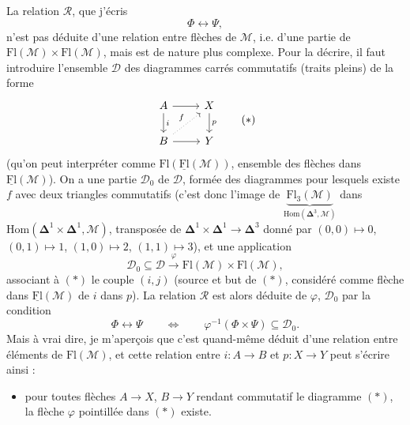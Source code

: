 \documentclass[11pt]{article}
\newcommand{\printedpage}[1]{\marginpar{\footnotesize p.~#1}}
\newcommand{\msp}[1]{\marginpar{\footnotesize [#1]}}
\newcommand{\Fl}{\mathrm{Fl}}
\begin{document}
\begin{itemize}[leftmargin=2.5em]
La relation $\mathcal{R}$, que j'écris
\[
\Phi\longleftrightarrow\Psi,
\]
\msp{page 81}n'est pas déduite d'une relation entre flèches de $\mathcal{M}$, i.e. d'une partie de $\Fl(\mathcal{M})\times\Fl(\mathcal{M})$, mais est de nature plus complexe. Pour la décrire, il faut introduire l'ensemble $\mathcal{D}$ des diagrammes carrés commutatifs (traits pleins) de la forme
\[
\begin{tikzcd}
A \arrow[r] \arrow[d, "i"] & X \arrow[d, "p"] \\
B \arrow[r] \arrow[ur, dotted, "f"] & Y
\end{tikzcd}
\tag*{$(*)$}
\]
\printedpage{50}
(qu'on peut interpréter comme $\Fl(\underline{\Fl}(\mathcal{M}))$, ensemble des flèches dans $\underline{\Fl}(\mathcal{M})$). On a une partie $\mathcal{D}_0$ de $\mathcal{D}$, formée des diagrammes pour lesquels existe $f$ avec deux triangles commutatifs (c'est donc l'image de $\underbrace{\Fl_3(\mathcal{M})}_{\mathrm{Hom}(\boldsymbol{\Delta}^3,\mathcal{M})}$ dans $\mathrm{Hom}(\boldsymbol{\Delta}^1\times\boldsymbol{\Delta}^1,\mathcal{M})$, transposée de $\boldsymbol{\Delta}^1\times\boldsymbol{\Delta}^1\longrightarrow\boldsymbol{\Delta}^3$ donné par $(0,0)\longmapsto 0$, $(0,1)\longmapsto 1$, $(1,0)\longmapsto 2$, $(1,1)\longmapsto 3$), et une application
\[
\mathcal{D}_0\subseteq\mathcal{D}\xrightarrow{\ \varphi\ }\Fl(\mathcal{M})\times\Fl(\mathcal{M}),
\]
associant à $(*)$ le couple $(i,j)$ (source et but de $(*)$, considéré comme flèche dans $\underline{\Fl}(\mathcal{M})$ de $i$ dans $p$). La relation $\mathcal{R}$ est alors déduite de $\varphi$, $\mathcal{D}_0$ par la condition
\msp{page 82}
\[
\Phi\longleftrightarrow\Psi\qquad\Longleftrightarrow\qquad\varphi^{-1}(\Phi\times\Psi)\subseteq\mathcal{D}_0.
\]
Mais à vrai dire, je m'aperçois que c'est quand-même déduit d'une relation entre éléments de $\Fl(\mathcal{M})$, et cette relation entre $i : A\longrightarrow B$ et $p : X\longrightarrow Y$ peut s'écrire ainsi :
\begin{itemize}[leftmargin=3em]
\item[$(**)$] pour toutes flèches $A\longrightarrow X$, $B\longrightarrow Y$ rendant commutatif le diagramme $(*)$, la flèche $\varphi$ pointillée dans $(*)$ existe. %
\end{itemize}
\end{itemize}
\end{document}
